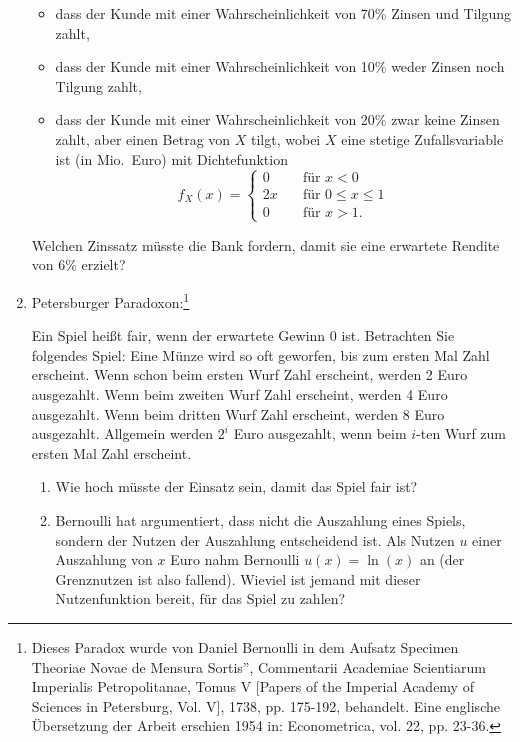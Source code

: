\begin{enumerate}
\begin{itemize}
\item dass der Kunde mit einer Wahrscheinlichkeit von 70\% Zinsen und Tilgung zahlt,
\item dass der Kunde mit einer Wahrscheinlichkeit von 10\% weder Zinsen noch Tilgung zahlt,
\item dass der Kunde mit einer Wahrscheinlichkeit von 20\% zwar keine Zinsen
zahlt, aber einen Betrag von $X$ tilgt, wobei $X$ eine stetige
Zufallsvariable ist (in Mio.\ Euro) mit Dichtefunktion%
\begin{equation*}
f_{X}\left( x\right) =\left\{ 
\begin{array}{ll}
0 & \quad \text{f\"{u}r }x<0 \\ 
2x & \quad \text{f\"{u}r }0\leq x\leq 1 \\ 
0 & \quad \text{f\"{u}r }x>1.%
\end{array}%
\right.
\end{equation*}
\end{itemize}

Welchen Zinssatz m\"{u}sste die Bank fordern, damit sie eine erwartete
Rendite von 6\% erzielt?

\item Petersburger Paradoxon:\footnote{%
Dieses Paradox wurde von Daniel Bernoulli in dem Aufsatz \quotedblbase
Specimen Theoriae Novae de Mensura Sortis\textquotedblright , Commentarii
Academiae Scientiarum Imperialis Petropolitanae, Tomus V [Papers of the
Imperial Academy of Sciences in Petersburg, Vol. V], 1738, pp. 175-192,
behandelt. Eine englische \"{U}bersetzung der Arbeit erschien 1954 in:
Econometrica, vol. 22, pp. 23-36.}

Ein Spiel hei\ss t fair, wenn der erwartete Gewinn 0 ist. Betrachten Sie
folgendes Spiel: Eine M\"{u}nze wird so oft geworfen, bis zum ersten Mal
Zahl erscheint. Wenn schon beim ersten Wurf Zahl erscheint, werden 2 Euro
ausgezahlt. Wenn beim zweiten Wurf Zahl erscheint, werden 4 Euro ausgezahlt.
Wenn beim dritten Wurf Zahl erscheint, werden 8 Euro ausgezahlt. Allgemein
werden $2^{i}$ Euro ausgezahlt, wenn beim $i$-ten Wurf zum ersten Mal Zahl
erscheint.
\begin{enumerate}
\item Wie hoch m\"{u}sste der Einsatz sein, damit das Spiel fair ist?
\item Bernoulli hat argumentiert, dass nicht die Auszahlung eines Spiels,
sondern der Nutzen der Auszahlung entscheidend ist. Als Nutzen $u$ einer
Auszahlung von $x$ Euro nahm Bernoulli $u\left( x\right) =\ln \left(
x\right) $ an (der Grenznutzen ist also fallend). Wieviel ist jemand mit
dieser Nutzenfunktion bereit, f\"{u}r das Spiel zu zahlen?


\end{enumerate}
\end{enumerate}
